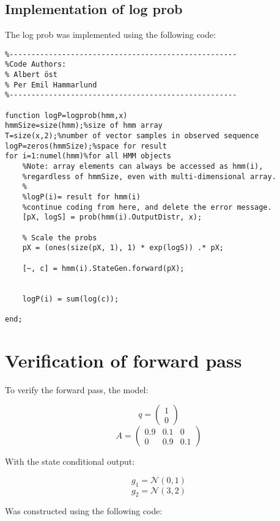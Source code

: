 \documentclass[]{article}
\begin{document}
\newpage

\subsection{Implementation of log
prob}\label{implementation-of-log-prob}

The log prob was implemented using the following code:

\begin{verbatim}
%----------------------------------------------------
%Code Authors:
% Albert öst
% Per Emil Hammarlund
%----------------------------------------------------

function logP=logprob(hmm,x)
hmmSize=size(hmm);%size of hmm array
T=size(x,2);%number of vector samples in observed sequence
logP=zeros(hmmSize);%space for result
for i=1:numel(hmm)%for all HMM objects
    %Note: array elements can always be accessed as hmm(i),
    %regardless of hmmSize, even with multi-dimensional array.
    %
    %logP(i)= result for hmm(i)
    %continue coding from here, and delete the error message.
    [pX, logS] = prob(hmm(i).OutputDistr, x);

    % Scale the probs
    pX = (ones(size(pX, 1), 1) * exp(logS)) .* pX;

    [~, c] = hmm(i).StateGen.forward(pX);


    logP(i) = sum(log(c));

end;
\end{verbatim}

\newpage

\section{Verification of forward
pass}\label{verification-of-forward-pass}

To verify the forward pass, the model:

\[q = \begin{pmatrix}1 \\ 0 \end{pmatrix}\]
\[A = \begin{pmatrix}0.9 & 0.1 & 0 \\ 0 & 0.9 & 0.1 \end{pmatrix}\]

With the state conditional output:

\[g_1 = \mathcal{N}\left( 0, 1 \right)\]
\[g_2 = \mathcal{N}\left( 3, 2 \right)\]

Was constructed using the following code:
\end{document}
